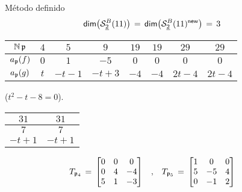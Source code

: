 \begin{frame}{M\'{e}todo definido}
	\begin{align*}
		\dim{\spitzH[B]2{11}} & \,=\,\dim{\spitzH[B]2{11}^\neue}\,=\,3
	\end{align*}
	\begin{center}
		\begin{tabular}{c|ccccccc}%
			$\idnorm\,\frak p$ & $4$ & $5$ & $9$ &
				$19$ & $19$ & $29$ & $29$ \\
			\hline
			$a_{\frak p}(f)$ & $0$ & $1$ & $-5$ &
				$0$ & $0$ & $0$ & $0$ \\
			$a_{\frak p}(g)$ & $t$ & $-t-1$ & $-t+3$ &
				$-4$ & $-4$ & $2t-4$ & $2t-4$
		\end{tabular}
	\end{center}
	($t^2-t-8=0$).\hfill
		\begin{tabular}{cc}
			$31$ & $31$ \\
			\hline
			$7$ & $7$ \\
			$-t+1$ & $-t+1$
		\end{tabular}
	\begin{align*}
		T_{\frak p_4} \,=\,
			\begin{bmatrix}
				0 & 0 & 0 \\ 0 & 4 & -4 \\ 5 & 1 & -3
			\end{bmatrix} & \quad\text{,}\quad
		T_{\frak p_5} \,=\,
			\begin{bmatrix}
				1 & 0 & 0 \\ 5 & -5 & 4 \\ 0 & -1 & 2
			\end{bmatrix}
	\end{align*}
\end{frame}

